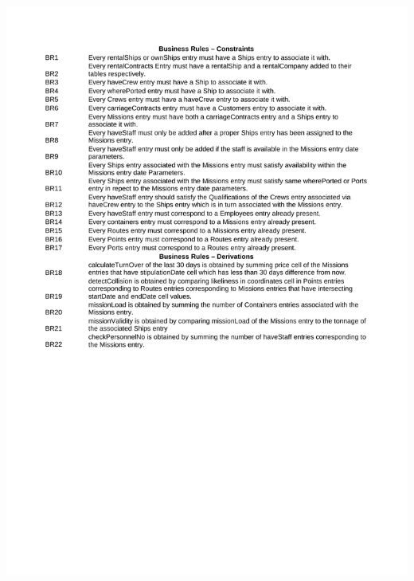 \documentclass[10pt]{report}
\begin{document}
\begin{center}
	\includegraphics[trim=2cm 10cm 0cm 0cm,clip=true, height=.85\textheight, width=\textwidth]{BusinessRules.pdf}
\end{center}
\newpage
\end{document}
